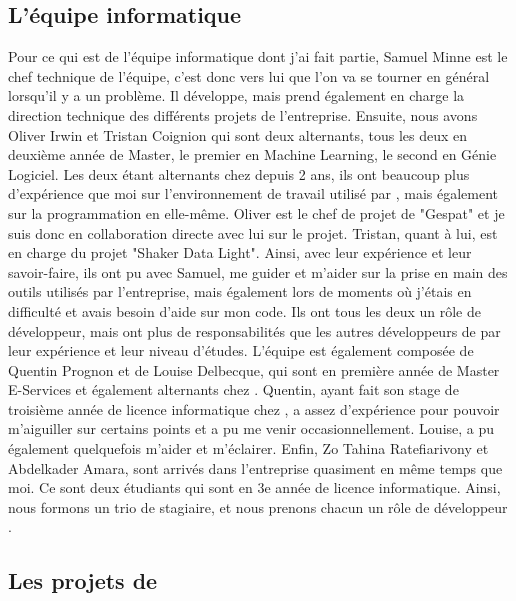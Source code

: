 \documentclass[12pt,oneside,noprintercorrection]{iut}
\begin{document}
\subsection{L'équipe informatique}
Pour ce qui est de l'équipe informatique dont j'ai fait partie, Samuel Minne est le chef technique de l'équipe, c'est donc vers lui que l'on va se tourner en général lorsqu'il y a un problème. Il développe, mais prend également en charge la direction technique des différents projets de l'entreprise. Ensuite, nous avons Oliver Irwin et Tristan Coignion qui sont deux alternants, tous les deux en deuxième année de Master, le premier en Machine Learning, le second en Génie Logiciel. Les deux étant alternants chez \gz{} depuis 2 ans, ils ont beaucoup plus d'expérience que moi sur l'environnement de travail utilisé par \gz{}, mais également sur la programmation en elle-même. Oliver est le chef de projet de "Gespat" et je suis donc en collaboration directe avec lui sur le projet. Tristan, quant à lui, est en charge du projet "Shaker Data Light". Ainsi, avec leur expérience et leur savoir-faire, ils ont pu avec Samuel, me guider et m'aider sur la prise en main des outils utilisés par l'entreprise, mais également lors de moments où j'étais en difficulté et avais besoin d'aide sur mon code. Ils ont tous les deux un rôle de développeur, mais ont plus de responsabilités que les autres développeurs de par leur expérience et leur niveau d'études. L'équipe est également composée de Quentin Prognon et de Louise Delbecque, qui sont en première année de Master E-Services et également alternants chez \gz{}. Quentin, ayant fait son stage de troisième année de licence informatique chez \gz{}, a assez d'expérience pour pouvoir m'aiguiller sur certains points et a pu me venir occasionnellement. Louise, a pu également quelquefois m'aider et m'éclairer. Enfin, Zo Tahina Ratefiarivony et Abdelkader Amara, sont arrivés dans l'entreprise quasiment en même temps que moi.  Ce sont deux étudiants qui sont en 3e année de licence informatique. Ainsi, nous formons un trio de stagiaire, et nous prenons chacun un rôle de développeur \slf{}.

\subsection{Les projets de \glaz{}}
\end{document}
